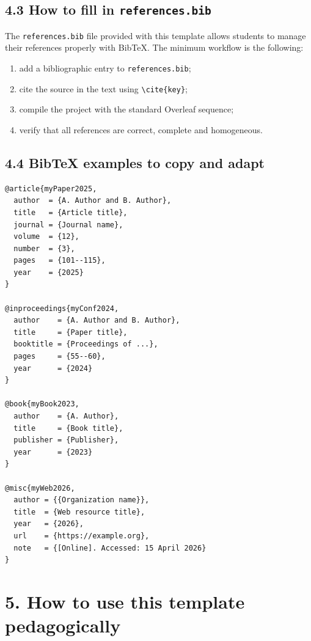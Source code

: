 \subsection*{4.3 How to fill in \texttt{references.bib}}

The \texttt{references.bib} file provided with this template allows students to manage their references properly with BibTeX. The minimum workflow is the following:

\begin{enumerate}[leftmargin=1.2cm]
\item add a bibliographic entry to \texttt{references.bib};
\item cite the source in the text using \texttt{\textbackslash cite\{key\}};
\item compile the project with the standard Overleaf sequence;
\item verify that all references are correct, complete and homogeneous.
\end{enumerate}

\subsection*{4.4 BibTeX examples to copy and adapt}

\begin{lstlisting}[numbers=none]
@article{myPaper2025,
  author  = {A. Author and B. Author},
  title   = {Article title},
  journal = {Journal name},
  volume  = {12},
  number  = {3},
  pages   = {101--115},
  year    = {2025}
}

@inproceedings{myConf2024,
  author    = {A. Author and B. Author},
  title     = {Paper title},
  booktitle = {Proceedings of ...},
  pages     = {55--60},
  year      = {2024}
}

@book{myBook2023,
  author    = {A. Author},
  title     = {Book title},
  publisher = {Publisher},
  year      = {2023}
}

@misc{myWeb2026,
  author = {{Organization name}},
  title  = {Web resource title},
  year   = {2026},
  url    = {https://example.org},
  note   = {[Online]. Accessed: 15 April 2026}
}
\end{lstlisting}


\section*{5. How to use this template pedagogically}

